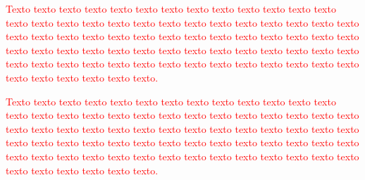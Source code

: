\documentclass[normaltoc, espacoumemeio, pnumromarab,ruledheader]{abnt}
\begin{document}
\textcolor{red}{Texto texto texto texto texto texto texto texto texto texto texto texto texto texto texto texto texto texto texto texto texto texto texto texto texto texto texto texto texto texto texto texto texto texto texto texto texto texto texto texto texto texto texto texto texto texto texto texto texto texto texto texto texto texto texto texto texto texto texto texto texto texto texto texto texto texto texto texto texto texto texto texto texto texto texto.}

\textcolor{red}{Texto texto texto texto texto texto texto texto texto texto texto texto texto texto texto texto texto texto texto texto texto texto texto texto texto texto texto texto texto texto texto texto texto texto texto texto texto texto texto texto texto texto texto texto texto texto texto texto texto texto texto texto texto texto texto texto texto texto texto texto texto texto texto texto texto texto texto texto texto texto texto texto texto texto texto.}
	

%


\end{document}
